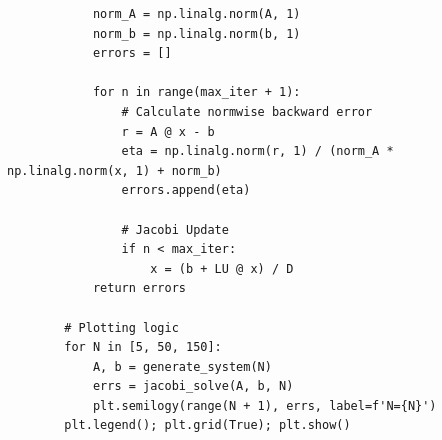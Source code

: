 \begin{solutionblock}
\begin{codebox}
\begin{verbatim}
            norm_A = np.linalg.norm(A, 1)
            norm_b = np.linalg.norm(b, 1)
            errors = []

            for n in range(max_iter + 1):
                # Calculate normwise backward error
                r = A @ x - b
                eta = np.linalg.norm(r, 1) / (norm_A * np.linalg.norm(x, 1) + norm_b)
                errors.append(eta)
                
                # Jacobi Update
                if n < max_iter:
                    x = (b + LU @ x) / D
            return errors

        # Plotting logic
        for N in [5, 50, 150]:
            A, b = generate_system(N)
            errs = jacobi_solve(A, b, N)
            plt.semilogy(range(N + 1), errs, label=f'N={N}')
        plt.legend(); plt.grid(True); plt.show()
        \end{verbatim}
        \caption{Jacobi implementation and error tracking.}
        \label{code:jacobi}
    \end{codebox}
\end{solutionblock}

\pagebreak